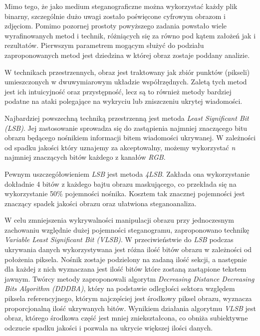 {    %
    Mimo tego, że jako medium steganograficzne można wykorzystać każdy plik binarny,
    szczególnie dużo uwagi zostało poświęcone cyfrowym obrazom i zdjęciom.
    Pomimo pozornej prostoty powyższego zadania powstało wiele wyrafinowanych metod i technik, różniących się za równo pod kątem
    założeń jak i rezultatów. 
    Pierwszym parametrem mogącym służyć do podziału zaproponowanych metod jest dziedzina w której 
    obraz zostaje poddany analizie. 

    W technikach przestrzennych, obraz jest traktowany jak zbiór punktów (pikseli) umieszczonych w dwuwymiarowym układzie współrzędnych.
    Zaletą tych metod jest ich intuicyjność oraz przystępność, lecz są to również metody bardziej podatne na ataki polegające na wykryciu
    lub zniszczeniu ukrytej wiadomości. %

    Najbardziej powszechną techniką przestrzenną jest metoda \textit{Least Significant Bit (LSB)}. Jej zastosowanie sprowadza się
    do zastąpienia najmniej znaczącego bitu obrazu będącego nośnikiem informacji bitem wiadomości ukrywanej. W zależności od spadku
    jakości który uznajemy za akceptowalny, możemy wykorzystać \textit{n} najmniej znaczących bitów każdego z kanałów \textit{RGB}.

    Pewnym uszczegółowieniem \textit{LSB} jest metoda \textit{4LSB}. Zakłada ona wykorzystanie dokładnie 4 bitów z każdego bajtu
    obrazu maskującego, co przekłada się na wykorzystanie 50\% pojemności nośnika. Kosztem tak znacznej pojemności jest znaczący spadek
    jakości obrazu oraz ułatwiona steganoanaliza.

    W celu zmniejszenia wykrywalności manipulacji obrazu przy jednoczesnym zachowaniu względnie dużej pojemności steganogramu,
    zaproponowano technikę \textit{Variable Least Significant Bit (VLSB)}. W przeciwieństwie do \textit{LSB} podczas ukrywania danych
    wykorzystywana jest różna ilość bitów obrazu w zależności od położenia piksela.
    Nośnik zostaje podzielony na zadaną ilość sekcji, a następnie dla każdej z nich wyznaczana jest ilość bitów które zostaną
    zastąpione tekstem jawnym. Twórcy metody zaproponowali algorytm \textit{Decreasing Distance Decreasing Bits Algorithm (DDDBA)},
    który na podstawie odległości sektora względem piksela referencyjnego, którym najczęściej jest środkowy piksel obrazu, wyznacza proporcjonalną
    ilość ukrywanych bitów. Wynikiem działania algorytmu \textit{VLSB} jest obraz, którego środkowa część jest mniej zniekształcona,
    co obniża subiektywne odczucie spadku jakości i pozwala na ukrycie większej ilości danych. %

}
